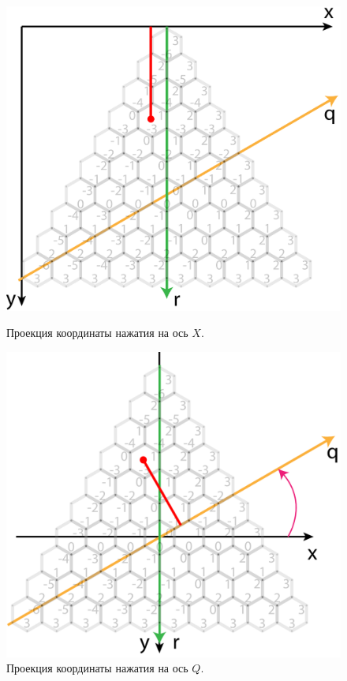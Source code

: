 \begin{figure}[h]
\begin{center}
\begin{minipage}[h]{0.47\linewidth}
\includegraphics[width=1\linewidth]{inc/img/calcPoint_two}
\caption{Проекция координаты нажатия на ось $X$.} %
\label{axis:cube} %
\end{minipage}
\hfill 
\begin{minipage}[h]{0.47\linewidth}
\includegraphics[width=1\linewidth]{inc/img/calcPoint_three}
\caption{Проекция координаты нажатия на ось $Q$.}
\label{axis:axial}
\end{minipage}
\end{center}
\end{figure}

